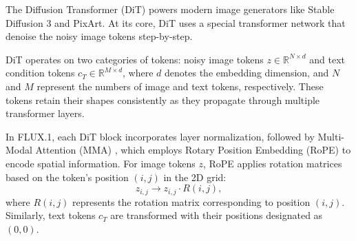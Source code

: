 

The Diffusion Transformer (DiT)\cite{dit} powers modern image generators like Stable Diffusion 3\cite{sd3} and PixArt\cite{chen2023pixartalpha}. At its core, DiT uses a special transformer network that denoise the noisy image tokens step-by-step. 


DiT operates on two categories of tokens: noisy image tokens $z \in \mathbb{R}^{N \times d}$ and text condition tokens $c_T \in \mathbb{R}^{M \times d}$, where $d$ denotes the embedding dimension, and $N$ and $M$ represent the numbers of image and text tokens, respectively. These tokens retain their shapes consistently as they propagate through multiple transformer layers.

In FLUX.1, each DiT block incorporates layer normalization, followed by Multi-Modal Attention (MMA) \cite{sd3}, which employs Rotary Position Embedding (RoPE) \cite{rope} to encode spatial information. For image tokens $z$, RoPE applies rotation matrices based on the token’s position $(i,j)$ in the 2D grid:
\begin{equation}
z_{i,j} \rightarrow z_{i,j} \cdot R(i,j),
\end{equation}
where $R(i,j)$ represents the rotation matrix corresponding to position $(i,j)$. Similarly, text tokens $c_T$ are transformed with their positions designated as $(0,0)$.

